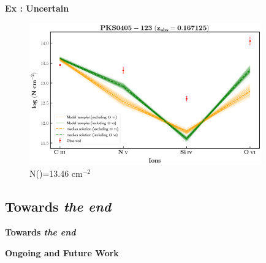 \documentclass[aspectratio=169,draft]{beamer}
\newcommand\ion[2]{\text{#1\,\textsc{\lowercase{#2}}}}
\begin{document}
\begin{frame}[noframenumbering]{\textbf{Ex : Uncertain}}

  \begin{figure}[!htbp]
    \centering
    \includegraphics[width=10cm]{Figures/pks0405-z=0.167125-compII.png}
    \vspace*{-1mm}
    \caption{N(\ion{H}{i})=13.46 cm$^{-2}$}
  \end{figure}  
  
  \end{frame}



\begin{frame}{}

\section{Towards \textit{the end}}

\vspace*{1cm}

{\huge{\textbf{Towards \textit{the end}}}}

\end{frame}


\begin{frame}{\huge{{\textbf{Ongoing and Future Work}}}}

  
\end{frame}
\end{document}
